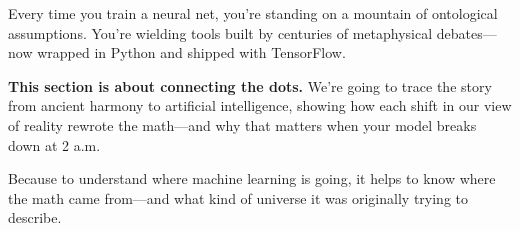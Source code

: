 Every time you train a neural net, you’re standing on a mountain of ontological assumptions. You’re wielding tools built by centuries of metaphysical debates—now wrapped in Python and shipped with TensorFlow.

\textbf{This section is about connecting the dots.}  
We’re going to trace the story from ancient harmony to artificial intelligence, showing how each shift in our view of reality rewrote the math—and why that matters when your model breaks down at 2 a.m.

Because to understand where machine learning is going, it helps to know where the math came from—and what kind of universe it was originally trying to describe.

